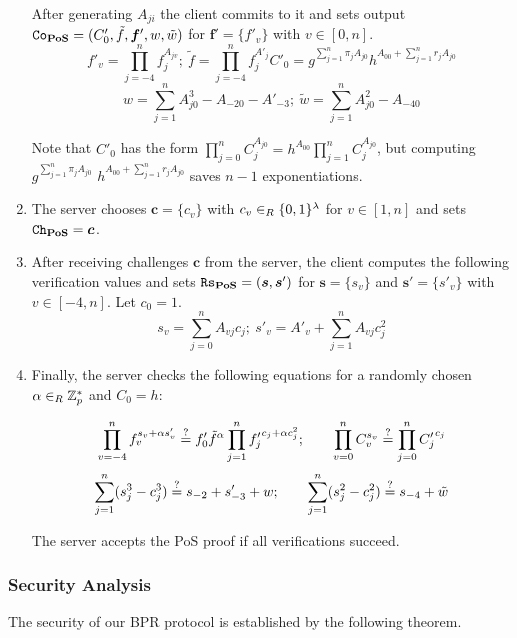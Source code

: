 \begin{enumerate}
\noindent
After generating $A_{ji}$ the client commits to it and sets output $\mathtt{Co}_\mathsf{\bf PoS}=(C'_0, \tilde{f}, \bm f', w, \tilde{w})$ for $\bm f'=\{f'_v\}$ with $v\in[0,n]$.
\[ 
 f'_v=\prod_{j=-4}^{n} f_j^{A_{jv}};~ \tilde{f}=\prod_{j=-4}^{n} f_j^{A'_{j}}
 C'_0=g^{\sum_{j=1}^{n} \pi_j A_{j0}} h^{A_{00}+\sum_{j=1}^{n} r_jA_{j0}}
\] 
\[w=\sum_{j=1}^n A_{j0}^3-A_{-20}-A'_{-3};~ \tilde{w}=\sum_{j=1}^n A_{j0}^2 - A_{-40} \]

\noindent
Note that $C'_0$ has the form $\prod_{j=0}^n C_j^{A_{j0}}=h^{A_{00}}\prod_{j=1}^n C_j^{A_{j0}}$, but computing $g^{\sum_{j=1}^{n} \pi_j A_{j0}}$ $h^{A_{00}+\sum_{j=1}^{n} r_jA_{j0}}$ saves $n-1$ exponentiations.


\item The server chooses $\bm c = \{c_v\}$ with $c_v\in_R\{0,1\}^\lambda$ for $v\in[1,n]$ and sets $\mathtt{Ch}_\mathsf{\bf PoS}=\bm c$.

\item After receiving challenges $\bm c$ from the server, the client computes the following verification values and sets \allowbreak $\mathtt{Rs}_\mathsf{\bf PoS}=(\bm s, \bm s')$ for $\bm s = \{s_v\}$ and $\bm s' = \{s'_v\}$ with $v\in[-4,n]$.
Let $c_0=1$.
\[ s_v = \sum_{j=0}^{n} A_{vj}c_j;~ s'_v = A'_v + \sum_{j=1}^{n} A_{vj}c_j^2 \] %


\item Finally, the server checks the following equations for a randomly chosen $\alpha\in_R\mathbb{Z}^\ast_p$ and $C_0=h$:

\[  \prod_{v=-4}^{n} f_v^{s_v+\alpha s'_v} \stackrel{?}{=} f'_0\tilde{f}^\alpha \prod_{j=1}^n {f'_j}^{c_j+\alpha c_j^2};\hspace*{2em}
    \prod_{v=0}^n C_v^{s_v} \stackrel{?}{=} \prod_{j=0}^n {C'_j}^{c_j} \]
\[  \sum_{j=1}^n (s_j^3 - c_j^3) \stackrel{?}{=} s_{-2} + s'_{-3} + w;\hspace*{2em}
    \sum_{j=1}^n (s_j^2 - c_j^2) \stackrel{?}{=} s_{-4} + \tilde{w} \]

\noindent
The server accepts the \ac{PoS} proof if all verifications succeed.
\end{enumerate}


\subsubsection{Security Analysis}
The security of our \ac{BPR} protocol is established by the following theorem. 

